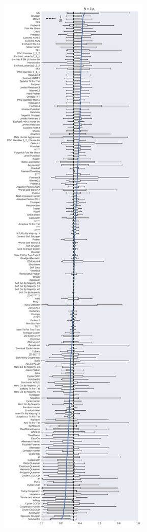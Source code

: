 \documentclass[10pt,journal]{IEEEtran}
\begin{document}
\begin{figure}[!hbtp]
    \centering
    \begin{subfigure}{.3\columnwidth}
        \centering
        \includegraphics[width=\columnwidth]{img/boxplot_3_invade.pdf}

\end{subfigure}
\end{figure}
\end{document}
